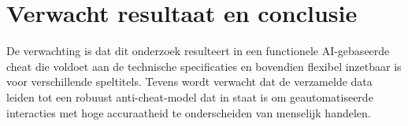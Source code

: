 \section{Verwacht resultaat en conclusie}%
\label{sec:verwachte_resultaten}

De verwachting is dat dit onderzoek resulteert in een functionele AI-gebaseerde cheat die voldoet aan de technische specificaties en bovendien flexibel inzetbaar is voor verschillende speltitels. Tevens wordt verwacht dat de verzamelde data leiden tot een robuust anti-cheat-model dat in staat is om geautomatiseerde interacties met hoge accuraatheid te onderscheiden van menselijk handelen.